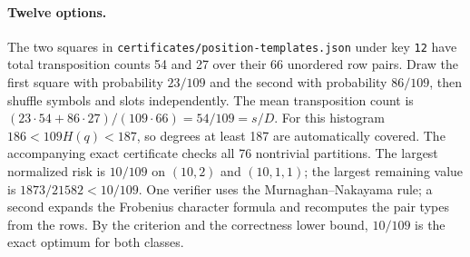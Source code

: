 \paragraph{Twelve options.}
The two squares in \texttt{certificates/position-templates.json}
under key \texttt{12} have total transposition counts 54 and 27 over
their 66 unordered row pairs. Draw the first square with probability
$23/109$ and the second with probability $86/109$, then shuffle
symbols and slots independently. The mean transposition count is
$(23\cdot54+86\cdot27)/(109\cdot66)=54/109=s/D$.
For this histogram $186<109H(q)<187$, so degrees at least 187 are
automatically covered. The accompanying exact certificate checks all
76 nontrivial partitions. The largest normalized risk is $10/109$
on $(10,2)$ and $(10,1,1)$; the largest remaining value is
$1873/21582<10/109$. One verifier uses the Murnaghan--Nakayama rule;
a second expands the Frobenius character formula and recomputes the
pair types from the rows. By the criterion and the correctness lower
bound, $10/109$ is the exact optimum for both classes.
